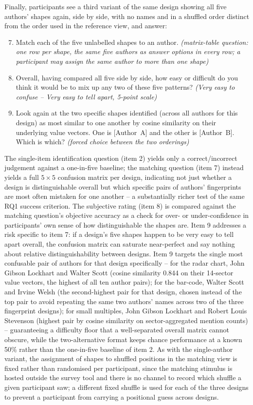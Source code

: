 \documentclass[logo,msc]{infthesis}
\begin{document}
Finally, participants see a third variant of the same design showing all five authors' shapes again, side by side, with no names and in a shuffled order distinct from the order used in the reference view, and answer:
\begin{enumerate}
  \setcounter{enumi}{6}
  \item Match each of the five unlabelled shapes to an author. \emph{(matrix-table question: one row per shape, the same five authors as answer options in every row; a participant may assign the same author to more than one shape)}
  \item Overall, having compared all five side by side, how easy or difficult do you think it would be to mix up any two of these five patterns? \emph{(Very easy to confuse -- Very easy to tell apart, 5-point scale)}
  \item Look again at the two specific shapes identified (across all authors for this design) as most similar to one another by cosine similarity on their underlying value vectors. One is [Author~A] and the other is [Author~B]. Which is which? \emph{(forced choice between the two orderings)}
\end{enumerate}
The single-item identification question (item 2) yields only a correct/incorrect judgement against a one-in-five baseline; the matching question (item 7) instead yields a full $5\times5$ confusion matrix per design, indicating not just whether a design is distinguishable overall but which specific pairs of authors' fingerprints are most often mistaken for one another -- a substantially richer test of the same RQ1 success criterion. The subjective rating (item 8) is compared against the matching question's objective accuracy as a check for over- or under-confidence in participants' own sense of how distinguishable the shapes are. Item 9 addresses a risk specific to item 7: if a design's five shapes happen to be very easy to tell apart overall, the confusion matrix can saturate near-perfect and say nothing about relative distinguishability between designs. Item 9 targets the single most confusable pair of authors for that design specifically -- for the radar chart, John Gibson Lockhart and Walter Scott (cosine similarity 0.844 on their 14-sector value vectors, the highest of all ten author pairs); for the bar-code, Walter Scott and Irvine Welsh (the second-highest pair for that design, chosen instead of the top pair to avoid repeating the same two authors' names across two of the three fingerprint designs); for small multiples, John Gibson Lockhart and Robert Louis Stevenson (highest pair by cosine similarity on sector-aggregated mention counts) -- guaranteeing a difficulty floor that a well-separated overall matrix cannot obscure, while the two-alternative format keeps chance performance at a known 50\% rather than the one-in-five baseline of item 2. As with the single-author variant, the assignment of shapes to shuffled positions in the matching view is fixed rather than randomised per participant, since the matching stimulus is hosted outside the survey tool and there is no channel to record which shuffle a given participant saw; a different fixed shuffle is used for each of the three designs to prevent a participant from carrying a positional guess across designs.
\end{document}
